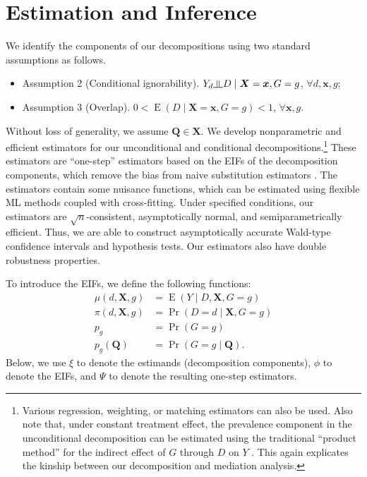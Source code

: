 \documentclass[12pt,a4paper]{article}
\newcommand{\indep}{\rotatebox[origin=c]{90}{$\models$}}  %
\newcommand{\E}{\operatorname{E}}
\def\X{{\boldsymbol X}}
\def\x{{\boldsymbol x}}
\def\Q{{\boldsymbol Q}}
\DeclareMathOperator{\Pro}{Pr}
\begin{document}
\section{Estimation and Inference}
We identify the components of our decompositions using two standard assumptions as follows.
\begin{itemize}
    \item[] Assumption 2 (Conditional ignorability). $Y_d \indep D \mid \X=\x, G=g$, $\forall d, \x, g$;
    \item[] Assumption 3 (Overlap). $0 < \E(D \mid \X=\x, G=g) <1$, $\forall \x, g$.
\end{itemize}
Without loss of generality, we assume $\Q \in \X$. 
We develop nonparametric and efficient estimators for our unconditional and conditional decompositions.\footnote{Various regression, weighting, or matching estimators can also be used. Also note that, under constant treatment effect, the prevalence component in the unconditional decomposition can be estimated using the traditional ``product method'' for the indirect effect of $G$ through $D$ on $Y$ \citep{baron_moderator-mediator_1986}. This again explicates the kinship between our decomposition and mediation analysis. }
These estimators are ``one-step'' estimators based on the EIFs of the decomposition components, which remove the bias from naive substitution estimators \citep{bickel_efficient_1998, van_der_vaart_asymptotic_2000,hines_demystifying_2022}. The estimators contain some nuisance functions, which can be estimated using flexible ML methods coupled with cross-fitting. Under specified conditions, our estimators are $\sqrt{n}$-consistent, asymptotically normal, and semiparametrically efficient. Thus, we are able to construct asymptotically accurate Wald-type confidence intervals and hypothesis tests. Our estimators also have double robustness properties.  

To introduce the EIFs, we define the following functions:
\begin{align*}
    \mu(d,\X, g)&=\E(Y \mid D, \X, G=g) \\
    \pi(d,\X, g) &= \Pro(D=d \mid \X, G=g) \\
    p_g &= \Pro(G=g) \\
    p_g(\Q) &= \Pro(G=g \mid \Q).
\end{align*}
Below, we use $\xi$ to denote the estimands (decomposition components), $\phi$ to denote the EIFs, and $\Psi$ to denote the resulting one-step estimators. 
\end{document}
